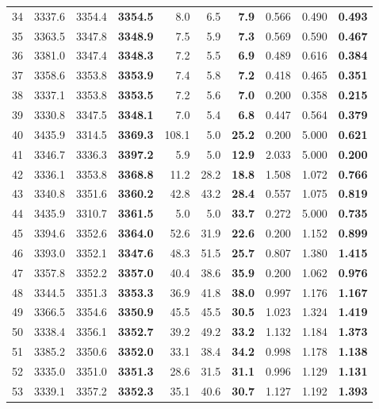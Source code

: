 \documentclass[a4paper,11pt]{article}
\begin{document}
\begin{longtable}{l rrr rrr rrr}
  34 & 3337.6 & 3354.4 & \textbf{3354.5} & 8.0 & 6.5 & \textbf{7.9} & 0.566 & 0.490 & \textbf{0.493} \\
  35 & 3363.5 & 3347.8 & \textbf{3348.9} & 7.5 & 5.9 & \textbf{7.3} & 0.569 & 0.590 & \textbf{0.467} \\
  36 & 3381.0 & 3347.4 & \textbf{3348.3} & 7.2 & 5.5 & \textbf{6.9} & 0.489 & 0.616 & \textbf{0.384} \\
  37 & 3358.6 & 3353.8 & \textbf{3353.9} & 7.4 & 5.8 & \textbf{7.2} & 0.418 & 0.465 & \textbf{0.351} \\
  38 & 3337.1 & 3353.8 & \textbf{3353.5} & 7.2 & 5.6 & \textbf{7.0} & 0.200 & 0.358 & \textbf{0.215} \\
  39 & 3330.8 & 3347.5 & \textbf{3348.1} & 7.0 & 5.4 & \textbf{6.8} & 0.447 & 0.564 & \textbf{0.379} \\
  40 & 3435.9 & 3314.5 & \textbf{3369.3} & 108.1 & 5.0 & \textbf{25.2} & 0.200 & 5.000 & \textbf{0.621} \\
  41 & 3346.7 & 3336.3 & \textbf{3397.2} & 5.9 & 5.0 & \textbf{12.9} & 2.033 & 5.000 & \textbf{0.200} \\
  42 & 3336.1 & 3353.8 & \textbf{3368.8} & 11.2 & 28.2 & \textbf{18.8} & 1.508 & 1.072 & \textbf{0.766} \\
  43 & 3340.8 & 3351.6 & \textbf{3360.2} & 42.8 & 43.2 & \textbf{28.4} & 0.557 & 1.075 & \textbf{0.819} \\
  44 & 3435.9 & 3310.7 & \textbf{3361.5} & 5.0 & 5.0 & \textbf{33.7} & 0.272 & 5.000 & \textbf{0.735} \\
  45 & 3394.6 & 3352.6 & \textbf{3364.0} & 52.6 & 31.9 & \textbf{22.6} & 0.200 & 1.152 & \textbf{0.899} \\
  46 & 3393.0 & 3352.1 & \textbf{3347.6} & 48.3 & 51.5 & \textbf{25.7} & 0.807 & 1.380 & \textbf{1.415} \\
  47 & 3357.8 & 3352.2 & \textbf{3357.0} & 40.4 & 38.6 & \textbf{35.9} & 0.200 & 1.062 & \textbf{0.976} \\
  48 & 3344.5 & 3351.3 & \textbf{3353.3} & 36.9 & 41.8 & \textbf{38.0} & 0.997 & 1.176 & \textbf{1.167} \\
  49 & 3366.5 & 3354.6 & \textbf{3350.9} & 45.5 & 45.5 & \textbf{30.5} & 1.023 & 1.324 & \textbf{1.419} \\
  50 & 3338.4 & 3356.1 & \textbf{3352.7} & 39.2 & 49.2 & \textbf{33.2} & 1.132 & 1.184 & \textbf{1.373} \\
  51 & 3385.2 & 3350.6 & \textbf{3352.0} & 33.1 & 38.4 & \textbf{34.2} & 0.998 & 1.178 & \textbf{1.138} \\
  52 & 3335.0 & 3351.0 & \textbf{3351.3} & 28.6 & 31.5 & \textbf{31.1} & 0.996 & 1.129 & \textbf{1.131} \\
  53 & 3339.1 & 3357.2 & \textbf{3352.3} & 35.1 & 40.6 & \textbf{30.7} & 1.127 & 1.192 & \textbf{1.393} \\
\bottomrule
\end{longtable}
\end{document}
